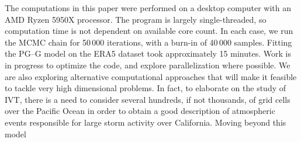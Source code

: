 The computations in this paper were performed on a desktop computer with an 
    AMD Ryzen 5950X processor. The program is largely single-threaded, so 
    computation time is not dependent on available core count.  In each case, 
    we run the MCMC chain for 50\,000 iterations, with a burn-in of 40\,000 
    samples.  Fitting the PG--G model on the ERA5 dataset took approximately 
    15 minutes.  Work is in progress to optimize the code, and explore 
    parallelization where possible.  We are also exploring alternative 
    computational approaches that will make it feasible to tackle very high 
    dimensional problems. In fact, to elaborate on the study of IVT, there is 
    a need to consider several hundreds, if not thousands, of grid cells over
    the Pacific Ocean in order to obtain a good description of atmospheric 
    events responsible for large storm activity over California.  Moving beyond
    this model



